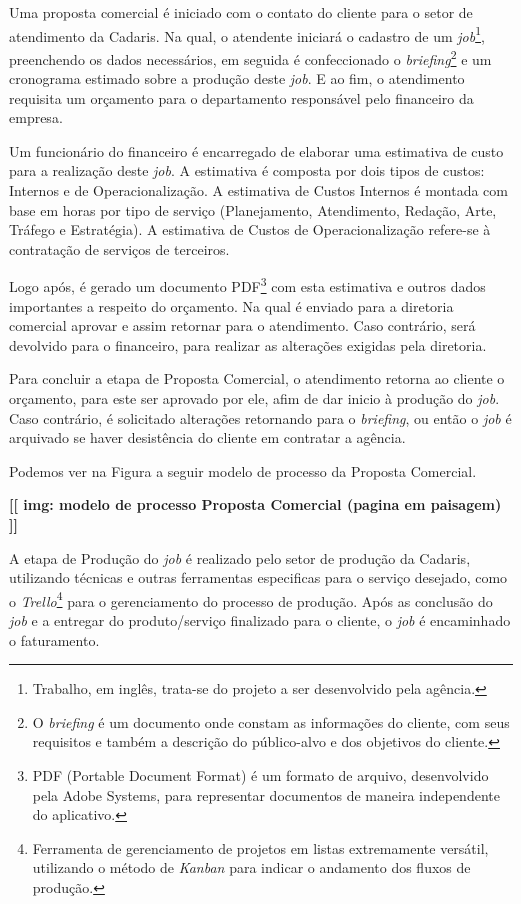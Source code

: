 \documentclass[
  12pt,				%
  openany,
  oneside,
  a4paper,			%
  english,			%
  brazil
]{article}
\numberwithin{figure}{section}
\numberwithin{table}{section}
\begin{document}
Uma proposta comercial é iniciado com o contato do cliente para o setor de atendimento da Cadaris. Na qual, o atendente iniciará o cadastro de um \textit{job}\footnote{Trabalho, em inglês, trata-se do projeto a ser desenvolvido pela agência.}, preenchendo os dados necessários, em seguida é confeccionado o \textit{briefing}\footnote{O \textit{briefing} é um documento onde constam as informações do cliente, com seus requisitos e também a descrição do público-alvo e dos objetivos do cliente.} e um cronograma estimado sobre a produção deste \textit{job}. E ao fim, o atendimento requisita um orçamento para o departamento responsável pelo financeiro da empresa. 

Um funcionário do financeiro é encarregado de elaborar uma estimativa de custo para a realização deste \textit{job}. A estimativa é composta por dois tipos de custos: Internos e de Operacionalização. A estimativa de Custos Internos é montada com base em horas por tipo de serviço (Planejamento, Atendimento, Redação, Arte, Tráfego e Estratégia). A estimativa de Custos de Operacionalização refere-se à contratação de serviços de terceiros.

Logo após, é gerado um documento PDF\footnote{PDF (Portable Document Format) é um formato de arquivo, desenvolvido pela Adobe Systems, para representar documentos de maneira independente do aplicativo.} com esta estimativa e outros dados importantes a respeito do orçamento. Na qual é enviado para a diretoria comercial aprovar e assim retornar para o atendimento. Caso contrário, será devolvido para o financeiro, para realizar as alterações exigidas pela diretoria.

Para concluir a etapa de Proposta Comercial, o atendimento retorna ao cliente o orçamento, para este ser aprovado por ele, afim de dar inicio à produção do \textit{job}. Caso contrário, é solicitado alterações retornando para o \textit{briefing}, ou então o \textit{job} é arquivado se haver desistência do cliente em contratar a agência.

Podemos ver na Figura a seguir modelo de processo da Proposta Comercial.

\textbf{[[ img: modelo de processo Proposta Comercial (pagina em paisagem) ]]}


A etapa de Produção do \textit{job} é realizado pelo setor de produção da Cadaris, utilizando técnicas e outras ferramentas especificas para o serviço desejado, como o \textit{Trello}\footnote{Ferramenta de gerenciamento de projetos em listas extremamente versátil, utilizando o método de \textit{Kanban} para indicar o andamento dos fluxos de produção.} para o gerenciamento do processo de produção.
Após as conclusão do \textit{job} e a entregar do produto/serviço finalizado para o cliente, o \textit{job} é encaminhado o faturamento. 
\end{document}
